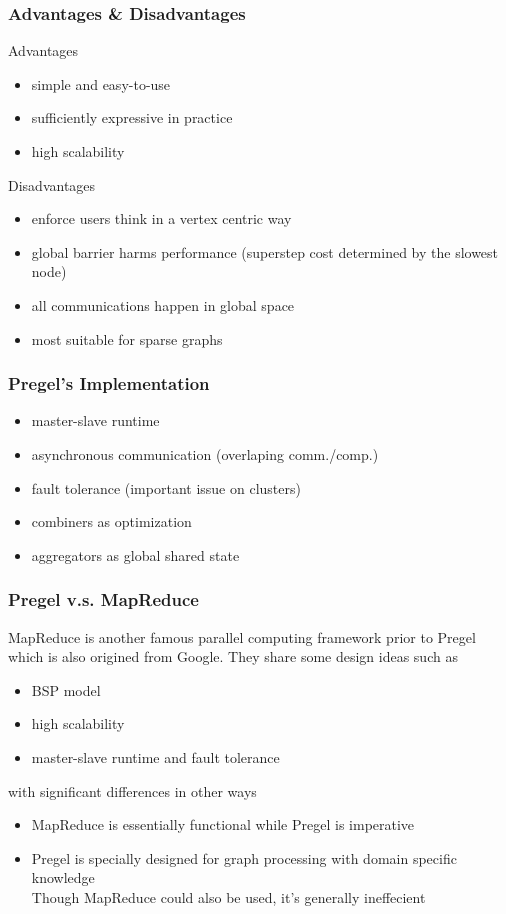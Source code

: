 \documentclass[]{beamer}
\begin{document}
\begin{frame}
  \frametitle{Advantages \& Disadvantages}
  Advantages
  \begin{itemize}
    \item simple and easy-to-use
    \item sufficiently expressive in practice
    \item high scalability
  \end{itemize}

  \pause
  Disadvantages
  \begin{itemize}
    \item enforce users think in a vertex centric way
    \item global barrier harms performance (superstep cost determined by the slowest node)
    \item all communications happen in global space
    \item most suitable for sparse graphs
  \end{itemize}
\end{frame}

\begin{frame}
  \frametitle{Pregel's Implementation}
  \begin{itemize}
    \item master-slave runtime
    \item asynchronous communication (overlaping comm./comp.)
    \item fault tolerance (important issue on clusters)
    \item combiners as optimization
    \item aggregators as global shared state
  \end{itemize}
\end{frame}


\begin{frame}
  \frametitle{Pregel v.s. MapReduce}
  MapReduce is another famous parallel computing framework  prior to Pregel which is also
  origined from Google. They share some design ideas such as
  \begin{itemize}
    \item BSP model
    \item high scalability
    \item master-slave runtime and fault tolerance
  \end{itemize}
  \pause
  with significant differences in other ways
  \begin{itemize}
    \item MapReduce is essentially functional while Pregel is imperative
    \item Pregel is specially designed for graph processing with domain specific knowledge \\
      Though MapReduce could also be used, it's generally ineffecient
  \end{itemize}
\end{frame}
\end{document}
